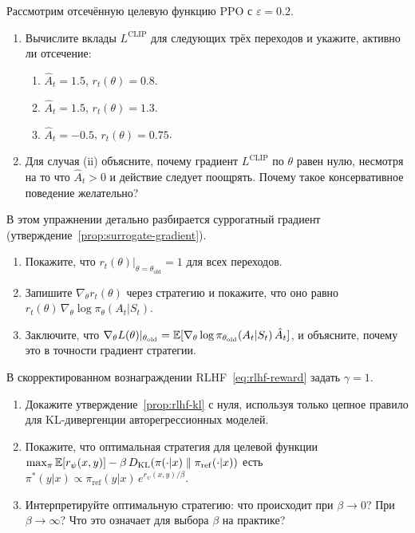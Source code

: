 \begin{exercise}
\label{ex:ppo-clip-numerical}
Рассмотрим отсечённую целевую функцию PPO с $\varepsilon = 0.2$.
\begin{enumerate}[label=(\alph*)]
  \item Вычислите вклады $L^{\mathrm{CLIP}}$ для следующих трёх переходов и укажите, активно ли отсечение:
    \begin{enumerate}[label=(\roman*)]
      \item $\hat{A}_t = 1.5$, $r_t(\theta) = 0.8$.
      \item $\hat{A}_t = 1.5$, $r_t(\theta) = 1.3$.
      \item $\hat{A}_t = -0.5$, $r_t(\theta) = 0.75$.
    \end{enumerate}
  \item Для случая (ii) объясните, почему градиент $L^{\mathrm{CLIP}}$ по $\theta$ равен нулю, несмотря на то что $\hat{A}_t > 0$ и действие следует поощрять. Почему такое консервативное поведение желательно?
\end{enumerate}
\end{exercise}

\begin{exercise}
\label{ex:surrogate-gradient-proof}
В этом упражнении детально разбирается суррогатный градиент (утверждение~\ref{prop:surrogate-gradient}).
\begin{enumerate}[label=(\alph*)]
  \item Покажите, что $r_t(\theta)|_{\theta=\theta_\mathrm{old}} = 1$ для всех переходов.
  \item Запишите $\nabla_\theta r_t(\theta)$ через стратегию и покажите, что оно равно $r_t(\theta)\,\nabla_\theta \log\pi_\theta(A_t|S_t)$.
  \item Заключите, что $\nabla_\theta L(\theta)|_{\theta_\mathrm{old}} = \operatorname{\mathbb{E}}[\nabla_\theta\log\pi_{\theta_\mathrm{old}}(A_t|S_t)\,\hat{A}_t]$, и объясните, почему это в точности градиент стратегии.
\end{enumerate}
\end{exercise}

\begin{exercise}
\label{ex:rlhf-kl}
В скорректированном вознаграждении RLHF~\eqref{eq:rlhf-reward} задать $\gamma = 1$.
\begin{enumerate}[label=(\alph*)]
  \item Докажите утверждение~\ref{prop:rlhf-kl} с нуля, используя только цепное правило для KL-дивергенции авторегрессионных моделей.
  \item Покажите, что оптимальная стратегия для целевой функции $\max_\pi \operatorname{\mathbb{E}}[r_\psi(x,y)] - \beta\,D_{\mathrm{KL}}\!\left(\pi(\cdot|x)\;\|\;\pi_{\mathrm{ref}}(\cdot|x)\right)$ есть $\pi^*(y|x) \propto \pi_{\mathrm{ref}}(y|x)\,e^{r_\psi(x,y)/\beta}$.
  \item Интерпретируйте оптимальную стратегию: что происходит при $\beta \to 0$? При $\beta \to \infty$? Что это означает для выбора $\beta$ на практике?
\end{enumerate}
\end{exercise}

